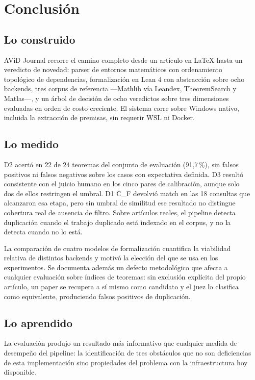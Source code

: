 \documentclass[12pt,a4paper]{article}
\theoremstyle{remark}
\begin{document}
\section{Conclusión}
\label{sec:conclusion}

\subsection{Lo construido}

AViD Journal recorre el camino completo desde un artículo en LaTeX hasta un veredicto de novedad: parser de entornos matemáticos con ordenamiento topológico de dependencias, formalización en Lean 4 con abstracción sobre ocho backends, tres corpus de referencia —Mathlib vía Leandex, TheoremSearch y Matlas—, y un árbol de decisión de ocho veredictos sobre tres dimensiones evaluadas en orden de costo creciente. El sistema corre sobre Windows nativo, incluida la extracción de premisas, sin requerir WSL ni Docker.

\subsection{Lo medido}

D2 acertó en 22 de 24 teoremas del conjunto de evaluación (91{,}7\,\%), sin falsos positivos ni falsos negativos sobre los casos con expectativa definida. D3 resultó consistente con el juicio humano en los cinco pares de calibración, aunque solo dos de ellos restringen el umbral. D1 C\_F devolvió match en las 18 consultas que alcanzaron esa etapa, pero sin umbral de similitud ese resultado no distingue cobertura real de ausencia de filtro. Sobre artículos reales, el pipeline detecta duplicación cuando el trabajo duplicado está indexado en el corpus, y no la detecta cuando no lo está.

La comparación de cuatro modelos de formalización cuantifica la viabilidad relativa de distintos backends y motivó la elección del que se usa en los experimentos. Se documenta además un defecto metodológico que afecta a cualquier evaluación sobre índices de teoremas: sin exclusión explícita del propio artículo, un paper se recupera a sí mismo como candidato y el juez lo clasifica como equivalente, produciendo falsos positivos de duplicación.

\subsection{Lo aprendido}

La evaluación produjo un resultado más informativo que cualquier medida de desempeño del pipeline: la identificación de tres obstáculos que no son deficiencias de esta implementación sino propiedades del problema con la infraestructura hoy disponible.
\end{document}
